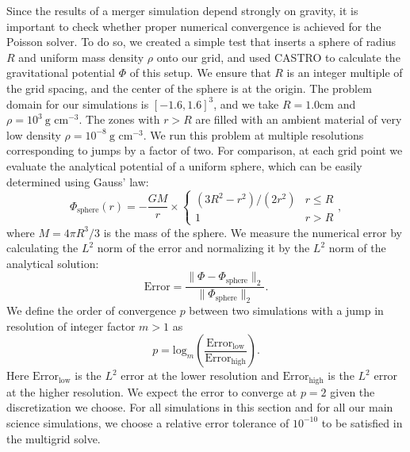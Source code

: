 \documentclass[iop]{emulateapj}
\begin{document}
Since the results of a merger simulation depend strongly on gravity,
it is important to check whether proper numerical convergence is
achieved for the Poisson solver. To do so, we created a simple test
that inserts a sphere of radius $R$ and uniform mass density $\rho$
onto our grid, and used CASTRO to calculate the gravitational
potential $\Phi$ of this setup. We ensure that $R$ is an integer
multiple of the grid spacing, and the center of the sphere is at the
origin. The problem domain for our simulations is $[-1.6, 1.6]^3$, and
we take $R = 1.0 \text{cm}$ and $\rho = 10^3\ \text{g cm}^{-3}$. 
The zones with $r > R$ are filled with an ambient material of very low density 
$\rho = 10^{-8}\ \text{g cm}^{-3}$. We run this problem at multiple 
resolutions corresponding to jumps by a factor of two. For
comparison, at each grid point we evaluate the analytical potential of
a uniform sphere, which can be easily determined using Gauss' law:
\begin{equation}
  \Phi_{\text{sphere}}(r) = -\frac{GM}{r} \times \begin{cases} (3R^2 - r^2)/(2 r^2) & r \leq R \\ 1 & r > R \end{cases},\label{eq:sphere-analytical}
\end{equation}
where $M = 4\pi R^3 / 3$ is the mass of the sphere. We measure the 
numerical error by calculating the $L^2$ norm of the error and 
normalizing it by the $L^2$ norm of the analytical solution:
\begin{equation}
  \text{Error} = \frac{\|\Phi - \Phi_{\text{sphere}}\|_2}{\|\Phi_{\text{sphere}}\|_2}.
\end{equation}
We define the order of convergence $p$ between two simulations with a jump 
in resolution of integer factor $m > 1$ as
\begin{equation}
  p = \text{log}_{m}\left(\frac{\text{Error}_{\text{low}}}{\text{Error}_{\text{high}}}\right).
\end{equation}
Here $\text{Error}_{\text{low}}$ is the $L^2$ error at the lower resolution 
and $\text{Error}_{\text{high}}$ is the $L^2$ error at the higher resolution.
We expect the error to converge at $p = 2$ given the discretization we choose. 
For all simulations in this section and for all our main science simulations,
we choose a relative error tolerance of $10^{-10}$ to be satisfied in the multigrid solve.
\end{document}
